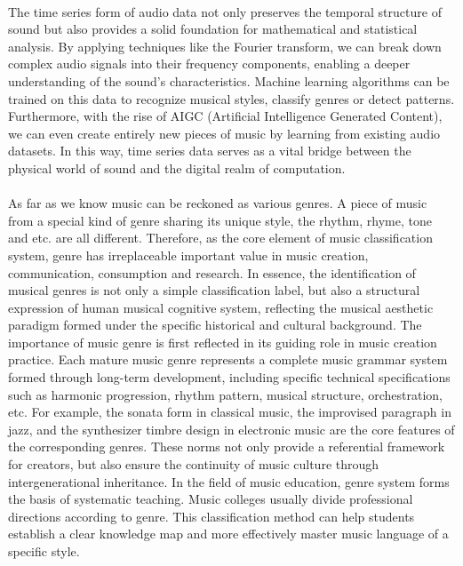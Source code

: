 \\
The time series form of audio data not only preserves the temporal structure of sound but also provides a solid foundation for mathematical and statistical analysis. By applying techniques like the Fourier transform, we can break down complex audio signals into their frequency components, enabling a deeper understanding of the sound’s characteristics. Machine learning algorithms can be trained on this data to recognize musical styles, classify genres or detect patterns. Furthermore, with the rise of AIGC (Artificial Intelligence Generated Content), we can even create entirely new pieces of music by learning from existing audio datasets. In this way, time series data serves as a vital bridge between the physical world of sound and the digital realm of computation.\\
\\
As far as we know music can be reckoned as various genres. A piece of music from a special kind of genre sharing its unique style, the rhythm, rhyme, tone and etc. are all different. Therefore, as the core element of music classification system, genre has irreplaceable important value in music creation, communication, consumption and research. In essence, the identification of musical genres is not only a simple classification label, but also a structural expression of human musical cognitive system, reflecting the musical aesthetic paradigm formed under the specific historical and cultural background. The importance of music genre is first reflected in its guiding role in music creation practice. Each mature music genre represents a complete music grammar system formed through long-term development, including specific technical specifications such as harmonic progression, rhythm pattern, musical structure, orchestration, etc. For example, the sonata form in classical music, the improvised paragraph in jazz, and the synthesizer timbre design in electronic music are the core features of the corresponding genres. These norms not only provide a referential framework for creators, but also ensure the continuity of music culture through intergenerational inheritance. In the field of music education, genre system forms the basis of systematic teaching. Music colleges usually divide professional directions according to genre. This classification method can help students establish a clear knowledge map and more effectively master music language of a specific style.\\
\\
